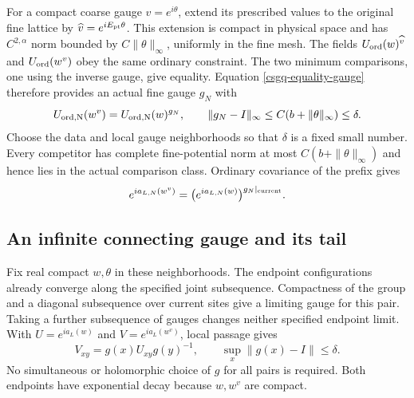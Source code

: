 For a compact coarse gauge $v=e^{i\theta}$, extend its prescribed values
to the original fine lattice by
$\widehat v=e^{iE_{\rm pt}\theta}$. This extension is compact in physical
space and has $C^{2,\alpha}$ norm bounded by $C\|\theta\|_\infty$,
uniformly in the fine mesh. The fields
$U_{\rm ord}(w)^{\widehat v}$ and $U_{\rm ord}(w^v)$ obey the same
ordinary constraint. The two minimum comparisons, one using the
inverse gauge, give equality. Equation \eqref{csgq-equality-gauge}
therefore provides an actual fine gauge $g_N$ with
\begin{equation}
 U_{\rm ord,N}(w^v)=U_{\rm ord,N}(w)^{g_N},\qquad
 \|g_N-I\|_\infty\le C(b+\|\theta\|_\infty)\le\delta.
 \label{csgq-finite-orbit}
\end{equation}
Choose the data and local gauge neighborhoods so that $\delta$ is a
fixed small number. Every competitor has complete fine-potential norm
at most $C(b+\|\theta\|_\infty)$ and hence lies in the actual comparison
class. Ordinary covariance of the prefix gives
\begin{equation}
 e^{ia_{L,N}(w^v)}
       =\bigl(e^{ia_{L,N}(w)}\bigr)^{g_N|_{\rm current}}.
 \label{csgq-prefix-orbit}
\end{equation}

\subsection{An infinite connecting gauge and its tail}
\label{csgq-tail-section}

Fix real compact $w,\theta$ in these neighborhoods. The endpoint
configurations already converge along the specified joint subsequence.
Compactness of the group and a diagonal subsequence over current sites
give a limiting gauge for this pair. Taking a further subsequence of
gauges changes neither specified endpoint limit. With
$U=e^{ia_L(w)}$ and $V=e^{ia_L(w^v)}$, local passage gives
\begin{equation}
 V_{xy}=g(x)U_{xy}g(y)^{-1},\qquad
                 \sup_x\|g(x)-I\|\le\delta.
 \label{csgq-infinite-orbit}
\end{equation}
No simultaneous or holomorphic choice of $g$ for all pairs is required.
Both endpoints have exponential decay because $w,w^v$ are compact.

